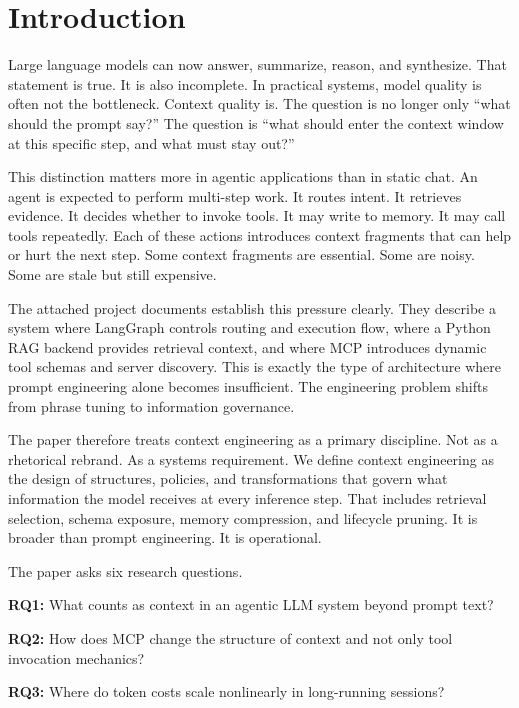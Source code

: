 \documentclass[conference]{IEEEtran}
\begin{document}
\section{Introduction}

Large language models can now answer, summarize, reason, and synthesize.
That statement is true.
It is also incomplete.
In practical systems, model quality is often not the bottleneck.
Context quality is.
The question is no longer only ``what should the prompt say?''
The question is ``what should enter the context window at this specific step, and what must stay out?''

This distinction matters more in agentic applications than in static chat.
An agent is expected to perform multi-step work.
It routes intent.
It retrieves evidence.
It decides whether to invoke tools.
It may write to memory.
It may call tools repeatedly.
Each of these actions introduces context fragments that can help or hurt the next step.
Some context fragments are essential.
Some are noisy.
Some are stale but still expensive.

The attached project documents establish this pressure clearly.
They describe a system where LangGraph controls routing and execution flow, where a Python RAG backend provides retrieval context, and where MCP introduces dynamic tool schemas and server discovery.
This is exactly the type of architecture where prompt engineering alone becomes insufficient.
The engineering problem shifts from phrase tuning to information governance.

The paper therefore treats context engineering as a primary discipline.
Not as a rhetorical rebrand.
As a systems requirement.
We define context engineering as the design of structures, policies, and transformations that govern what information the model receives at every inference step.
That includes retrieval selection, schema exposure, memory compression, and lifecycle pruning.
It is broader than prompt engineering.
It is operational.

The paper asks six research questions.

\textbf{RQ1:}
What counts as context in an agentic LLM system beyond prompt text?

\textbf{RQ2:}
How does MCP change the structure of context and not only tool invocation mechanics?

\textbf{RQ3:}
Where do token costs scale nonlinearly in long-running sessions?
\end{document}
